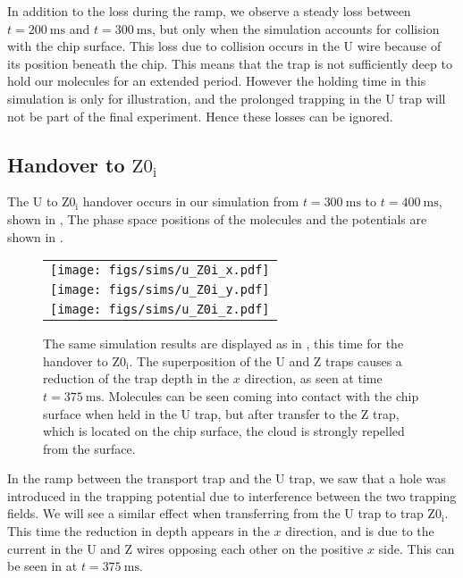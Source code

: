 In addition to the loss during the ramp, we observe a steady loss between
$t=\SI{200}{\milli\second}$ and $t=\SI{300}{\milli\second}$, but only when the
simulation accounts for collision with the chip surface. This loss due to
collision occurs in the U wire because of its position beneath the chip. This
means that the trap is not sufficiently deep to hold our molecules for an
extended period. However the holding time in this simulation is only for
illustration, and the prolonged trapping in the U trap will not be part of the
final experiment. Hence these losses can be ignored.

\subsection{Handover to $\mathrm{Z0_i}$}
\label{design:sim:U_to_Z0i}

The U to $\mathrm{Z0_i}$ handover occurs in our simulation from
$t=\SI{300}{\milli\second}$ to $t=\SI{400}{\milli\second}$, shown in
, 
The phase space positions of the molecules and the potentials are shown in
.

\begin{figure}[p]
\centering
  \begin{tabular}{c}
    \texttt{[image: figs/sims/u\_Z0i\_x.pdf]} \\
    \texttt{[image: figs/sims/u\_Z0i\_y.pdf]} \\
    \texttt{[image: figs/sims/u\_Z0i\_z.pdf]}
  \end{tabular}
  \caption{
    The same simulation results are displayed as in
    , this time for the handover to $\mathrm{Z0_i}$.
    The superposition of the U and Z traps causes a reduction of the trap depth
    in the $x$ direction, as seen at time $t=\SI{375}{\milli\second}$.
    Molecules can be seen coming into contact with the chip surface when held
    in the U trap, but after transfer to the Z trap, which is located on the
    chip surface, the cloud is strongly repelled from the surface.
  }
  \label{design:fig:U_Z0i}
\end{figure}

In the ramp between the transport trap and the U trap, we saw that a hole was
introduced in the trapping potential due to interference between the two
trapping fields. We will see a similar effect when transferring from the U trap
to trap $\mathrm{Z0_i}$.  This time the reduction in depth appears in the $x$
direction, and is due to the current in the U and Z wires opposing each other
on the positive $x$ side. This can be seen in  at
$t=\SI{375}{\milli\second}$.

